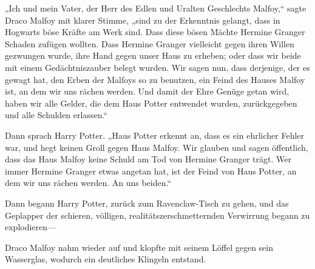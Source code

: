 „Ich und mein Vater, der Herr des Edlen und Uralten Geschlechts Malfoy,“ sagte Draco Malfoy mit klarer Stimme, „sind zu der Erkenntnis gelangt, dass in Hogwarts böse Kräfte am Werk sind. Dass diese bösen Mächte Hermine Granger Schaden zufügen wollten. Dass Hermine Granger vielleicht gegen ihren Willen gezwungen wurde, ihre Hand gegen unser Haus zu erheben; oder dass wir beide mit einem Gedächtniszauber belegt wurden. Wir sagen nun, dass derjenige, der es gewagt hat, den Erben der Malfoys so zu benutzen, ein Feind des Hauses Malfoy ist, an dem wir uns rächen werden. Und damit der Ehre Genüge getan wird, haben wir alle Gelder, die dem Haus Potter entwendet wurden, zurückgegeben und alle Schulden erlassen.“

Dann sprach Harry Potter.
„Haus Potter erkennt an, dass es ein ehrlicher Fehler war, und hegt keinen Groll gegen Haus Malfoy. Wir glauben und sagen öffentlich, dass das Haus Malfoy keine Schuld am Tod von Hermine Granger trägt. Wer immer Hermine Granger etwas angetan hat, ist der Feind von Haus Potter, an dem wir uns rächen werden. An uns beiden.“

Dann begann Harry Potter, zurück zum Ravenclaw-Tisch zu gehen, und das Geplapper der schieren, völligen, realitätszerschmetternden Verwirrung begann zu explodieren—

Draco Malfoy nahm wieder auf und klopfte mit seinem Löffel gegen sein Wasserglas, wodurch ein deutliches Klingeln entstand.

